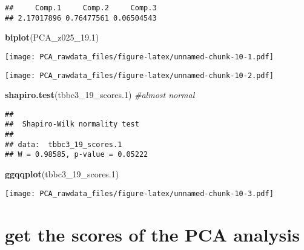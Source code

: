 \documentclass[]{article}
\newenvironment{Shaded}{\begin{snugshade}}{\end{snugshade}}
\newcommand{\CommentTok}[1]{\textcolor[rgb]{0.56,0.35,0.01}{\textit{#1}}}
\newcommand{\DecValTok}[1]{\textcolor[rgb]{0.00,0.00,0.81}{#1}}
\newcommand{\FloatTok}[1]{\textcolor[rgb]{0.00,0.00,0.81}{#1}}
\newcommand{\KeywordTok}[1]{\textcolor[rgb]{0.13,0.29,0.53}{\textbf{#1}}}
\newcommand{\NormalTok}[1]{#1}
\newcommand{\OperatorTok}[1]{\textcolor[rgb]{0.81,0.36,0.00}{\textbf{#1}}}
\newcommand{\StringTok}[1]{\textcolor[rgb]{0.31,0.60,0.02}{#1}}
\begin{document}
\begin{verbatim}
##     Comp.1     Comp.2     Comp.3 
## 2.17017896 0.76477561 0.06504543
\end{verbatim}

\begin{Shaded}
\begin{Highlighting}[]
\KeywordTok{biplot}\NormalTok{(PCA_z025_}\FloatTok{19.1}\NormalTok{)}
\end{Highlighting}
\end{Shaded}

\texttt{[image: PCA\_rawdata\_files/figure-latex/unnamed-chunk-10-1.pdf]}

\begin{Shaded}
\end{Shaded}

\texttt{[image: PCA\_rawdata\_files/figure-latex/unnamed-chunk-10-2.pdf]}

\begin{Shaded}
\begin{Highlighting}[]
\KeywordTok{shapiro.test}\NormalTok{(tbbc3_}\DecValTok{19}\NormalTok{_scores}\FloatTok{.1}\NormalTok{) }\CommentTok{#almost normal}
\end{Highlighting}
\end{Shaded}

\begin{verbatim}
## 
##  Shapiro-Wilk normality test
## 
## data:  tbbc3_19_scores.1
## W = 0.98585, p-value = 0.05222
\end{verbatim}

\begin{Shaded}
\begin{Highlighting}[]
\KeywordTok{ggqqplot}\NormalTok{(tbbc3_}\DecValTok{19}\NormalTok{_scores}\FloatTok{.1}\NormalTok{)}
\end{Highlighting}
\end{Shaded}

\texttt{[image: PCA\_rawdata\_files/figure-latex/unnamed-chunk-10-3.pdf]}

\hypertarget{get-the-scores-of-the-pca-analysis}{%
\section{get the scores of the PCA
analysis}\label{get-the-scores-of-the-pca-analysis}}
\end{document}
